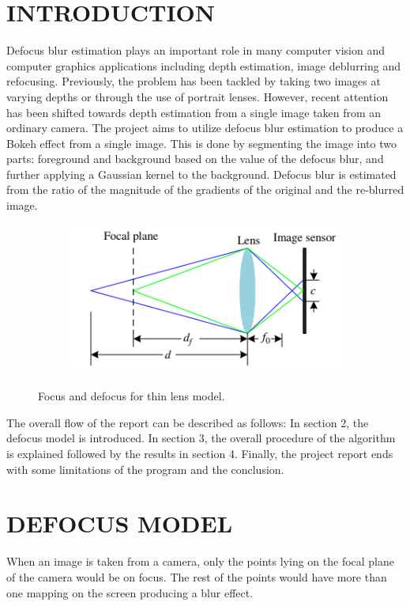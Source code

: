 \documentclass[letterpaper, 10 pt, conference]{ieeeconf}  %
\begin{document}
\section{INTRODUCTION}
Defocus blur estimation plays an important role in many computer
vision and computer graphics applications including depth estimation, image deblurring and refocusing. Previously, the problem has been tackled by taking two images at varying depths or through the use of portrait lenses. However, recent attention has been shifted towards depth estimation from a single image taken from an ordinary camera. The project aims to utilize defocus blur estimation to produce a Bokeh effect from a single image. This is done by segmenting the image into two parts: foreground and background based on the value of the defocus blur, and further applying a Gaussian kernel to the background. Defocus blur is estimated from the ratio of the magnitude of the gradients of the original and the re-blurred image. 
\begin{figure}[h]
\begin{subfigure}{0.5\textwidth}
\includegraphics[width=1\linewidth, height=5cm]{lens.png}
\label{fig:subim13}
\end{subfigure}
\caption{Focus and defocus for thin lens model.}
\label{fig:image23}
\end{figure}

The overall flow of the report can be described as follows: In section 2, the defocus model is introduced. In section 3, the overall procedure of the algorithm is explained followed by the results in section 4. Finally, the project report ends with some limitations of the program and the conclusion.  
                              
\section{DEFOCUS MODEL}
When an image is taken from a camera, only the points lying on the focal plane of the camera would be on focus. The rest of the points would have more than one mapping on the screen producing a blur effect.
\end{document}
